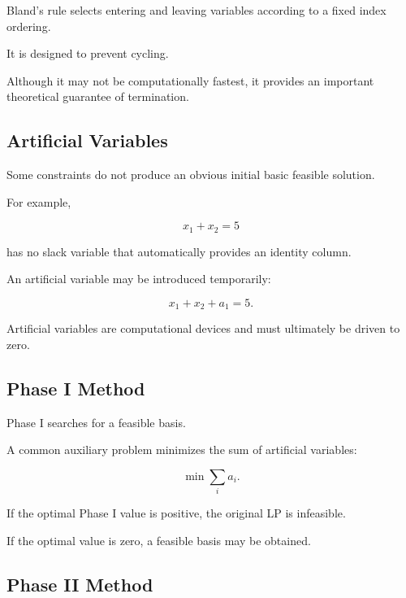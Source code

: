 Bland's rule selects entering and leaving variables according to a fixed
index ordering.

It is designed to prevent cycling.

Although it may not be computationally fastest, it provides an important
theoretical guarantee of termination.

\subsection{Artificial Variables}
\label{subsec:artificial-variables}

Some constraints do not produce an obvious initial basic feasible
solution.

For example,

\[
x_1+x_2=5
\]

has no slack variable that automatically provides an identity column.

An artificial variable may be introduced temporarily:

\[
\boxed{
x_1+x_2+a_1=5.
}
\]

Artificial variables are computational devices and must ultimately be
driven to zero.

\subsection{Phase I Method}
\label{subsec:phase-one-simplex}

Phase I searches for a feasible basis.

A common auxiliary problem minimizes the sum of artificial variables:

\[
\boxed{
\min
\sum_i a_i.
}
\]

If the optimal Phase I value is positive, the original LP is infeasible.

If the optimal value is zero, a feasible basis may be obtained.

\subsection{Phase II Method}
\label{subsec:phase-two-simplex}

